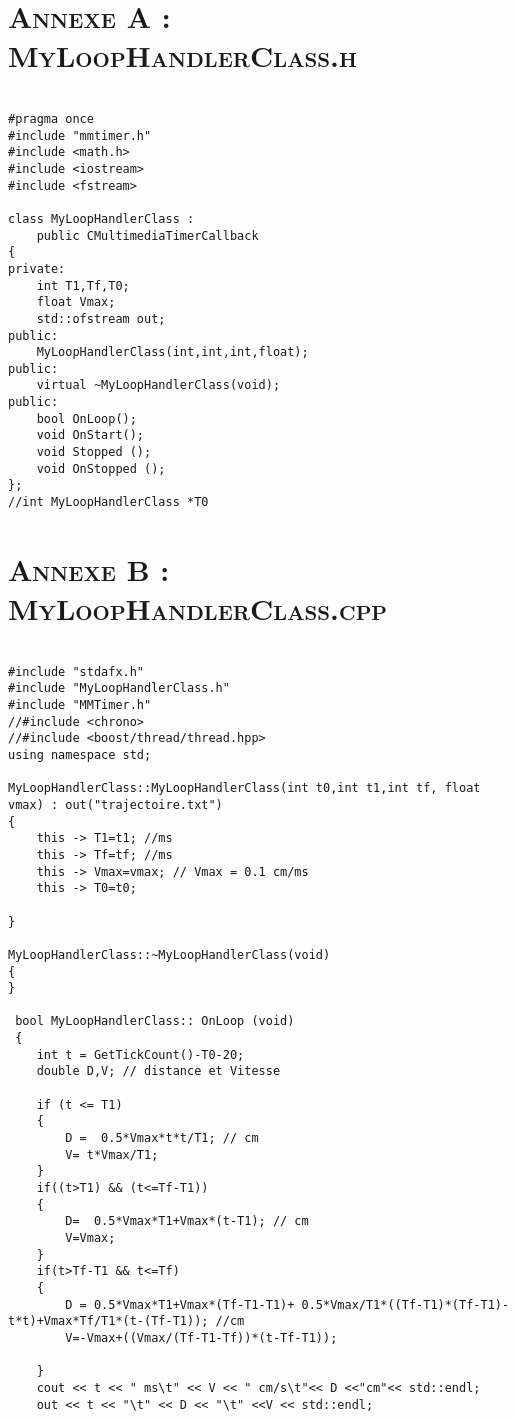 \begin{appendices}
\chapter*{\textsc{Annexe A : MyLoopHandlerClass.h}}
	
	\begin{lstlisting}	
	 
#pragma once
#include "mmtimer.h"
#include <math.h>
#include <iostream>
#include <fstream>

class MyLoopHandlerClass :
	public CMultimediaTimerCallback
{
private: 
	int T1,Tf,T0;
	float Vmax;
	std::ofstream out;
public:
	MyLoopHandlerClass(int,int,int,float);
public:
	virtual ~MyLoopHandlerClass(void);
public:
	bool OnLoop();
	void OnStart();
	void Stopped ();
	void OnStopped ();
};
//int MyLoopHandlerClass *T0

	\end{lstlisting}
	
	\chapter*{\textsc{Annexe B : MyLoopHandlerClass.cpp}}

	\begin{lstlisting}	
	 
#include "stdafx.h"
#include "MyLoopHandlerClass.h"
#include "MMTimer.h"
//#include <chrono>
//#include <boost/thread/thread.hpp>
using namespace std;

MyLoopHandlerClass::MyLoopHandlerClass(int t0,int t1,int tf, float vmax) : out("trajectoire.txt")
{
	this -> T1=t1; //ms
	this -> Tf=tf; //ms
	this -> Vmax=vmax; // Vmax = 0.1 cm/ms
	this -> T0=t0;
	
}

MyLoopHandlerClass::~MyLoopHandlerClass(void)
{
}

 bool MyLoopHandlerClass:: OnLoop (void)
 {	
	int t = GetTickCount()-T0-20;
	double D,V; // distance et Vitesse 
	
	if (t <= T1)
	{
		D =  0.5*Vmax*t*t/T1; // cm
		V= t*Vmax/T1;  
	}
	if((t>T1) && (t<=Tf-T1))
	{
		D=  0.5*Vmax*T1+Vmax*(t-T1); // cm
		V=Vmax;
	} 
	if(t>Tf-T1 && t<=Tf)
	{
		D = 0.5*Vmax*T1+Vmax*(Tf-T1-T1)+ 0.5*Vmax/T1*((Tf-T1)*(Tf-T1)-t*t)+Vmax*Tf/T1*(t-(Tf-T1)); //cm 
		V=-Vmax+((Vmax/(Tf-T1-Tf))*(t-Tf-T1));
		
	}
	cout << t << " ms\t" << V << " cm/s\t"<< D <<"cm"<< std::endl;
	out << t << "\t" << D << "\t" <<V << std::endl;


\end{lstlisting}
\end{appendices}
